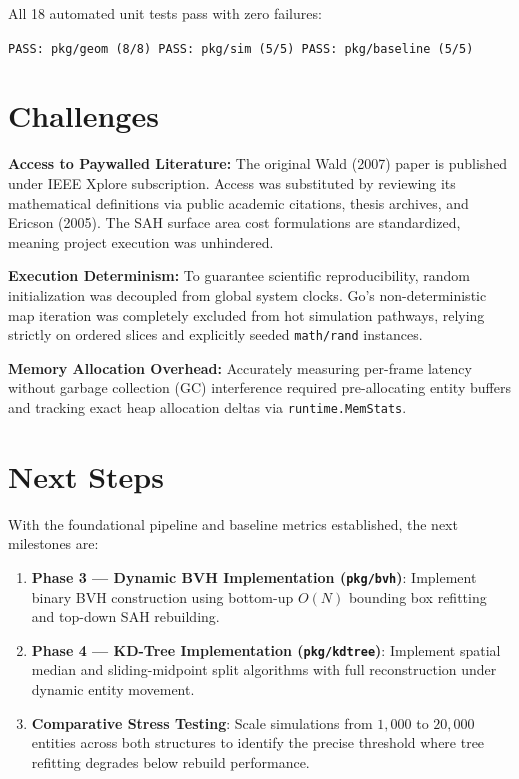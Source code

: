 \documentclass[12pt]{article}
\begin{document}
All 18 automated unit tests pass with zero failures:
\begin{center}
\texttt{PASS: pkg/geom (8/8) \quad PASS: pkg/sim (5/5) \quad PASS: pkg/baseline (5/5)}
\end{center}

\section{Challenges}

\textbf{Access to Paywalled Literature:} The original Wald (2007) paper is published under IEEE Xplore subscription. Access was substituted by reviewing its mathematical definitions via public academic citations, thesis archives, and Ericson (2005). The SAH surface area cost formulations are standardized, meaning project execution was unhindered.

\textbf{Execution Determinism:} To guarantee scientific reproducibility, random initialization was decoupled from global system clocks. Go's non-deterministic map iteration was completely excluded from hot simulation pathways, relying strictly on ordered slices and explicitly seeded \texttt{math/rand} instances.

\textbf{Memory Allocation Overhead:} Accurately measuring per-frame latency without garbage collection (GC) interference required pre-allocating entity buffers and tracking exact heap allocation deltas via \texttt{runtime.MemStats}.

\section{Next Steps}

With the foundational pipeline and baseline metrics established, the next milestones are:

\begin{enumerate}
    \item \textbf{Phase 3 --- Dynamic BVH Implementation (\texttt{pkg/bvh})}:
    Implement binary BVH construction using bottom-up $O(N)$ bounding box refitting and top-down SAH rebuilding.
    \item \textbf{Phase 4 --- KD-Tree Implementation (\texttt{pkg/kdtree})}:
    Implement spatial median and sliding-midpoint split algorithms with full reconstruction under dynamic entity movement.
    \item \textbf{Comparative Stress Testing}:
    Scale simulations from $1{,}000$ to $20{,}000$ entities across both structures to identify the precise threshold where tree refitting degrades below rebuild performance.
\end{enumerate}
\end{document}
